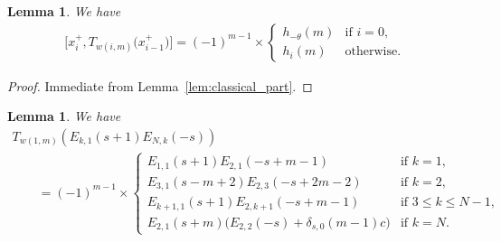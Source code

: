 \documentclass[10pt,a4paper]{amsart}
\newtheorem{lem}[thm]{Lemma}
\theoremstyle{definition}
\numberwithin{equation}{section}
\begin{document}
\begin{lem}\label{lem:braket_pre}
We have
\begin{gather*} \big[x_{i}^+, T_{w(i,m)}\big(x_{i-1}^+\big)\big] = (-1)^{m-1} \times \begin{cases}
h_{-\theta}(m) & \text{if $i=0$},\\
h_i(m) & \text{otherwise}.
\end{cases}
\end{gather*}
\end{lem}

\begin{proof}
Immediate from Lemma~\ref{lem:classical_part}.
\end{proof}

\begin{lem}\label{lem:i=1}We have
\begin{gather*}
T_{w(1,m)}(E_{k,1}(s+1)E_{N,k}(-s)) \\
\qquad{} = (-1)^{m-1} \times\begin{cases}
E_{1,1}(s+1)E_{2,1}(-s+m-1) & \text{if $k=1$},\\
E_{3,1}(s-m+2)E_{2,3}(-s+2m-2) & \text{if $k=2$},\\
E_{k+1,1}(s+1)E_{2,k+1}(-s+m-1) & \text{if $3 \leq k \leq N-1$},\\
E_{2,1}(s+m)\Big( E_{2,2}(-s) + \delta_{s,0}(m-1)c \Big) & \text{if $k=N$}.
\end{cases}
\end{gather*}
\end{lem}
\end{document}
